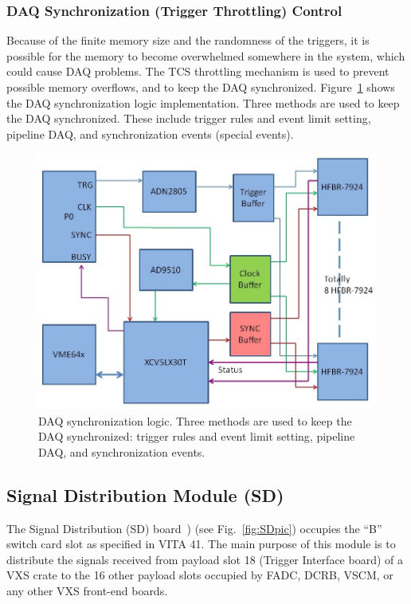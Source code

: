 \subsubsection{DAQ Synchronization (Trigger Throttling) Control}

Because of the finite memory size and the randomness of the triggers, it is possible for the memory to become
overwhelmed somewhere in the system, which could cause DAQ problems. The TCS throttling mechanism is used to
prevent possible memory overflows, and to keep the DAQ synchronized. Figure~\ref{fig:DAQ_synchronization} shows the
DAQ synchronization logic implementation. Three methods are used to keep the DAQ synchronized. These include trigger
rules and event limit setting, pipeline DAQ, and synchronization events (special events).

\begin{figure}[hbt]
	\centering
	\includegraphics[width=1.0\columnwidth,keepaspectratio]{img/TDdiagram.jpg}
	\caption{DAQ synchronization logic. Three methods are used to keep the DAQ synchronized: trigger rules and
          event limit setting, pipeline DAQ, and synchronization events.}
	\label{fig:DAQ_synchronization}
\end{figure}

\subsection{Signal Distribution Module (SD)}

The Signal Distribution (SD) board~\cite{sd-ref}) (see Fig.~\ref{fig:SDpic}) occupies the “B” switch card slot as
specified in VITA 41. The main purpose of this module is to distribute the signals received from payload slot 18
(Trigger Interface board) of a VXS crate to the 16 other payload slots occupied by FADC, DCRB, VSCM, or any other
VXS front-end boards.

